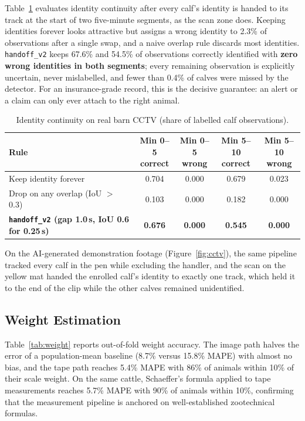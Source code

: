 \documentclass[11pt,letterpaper]{article}
\begin{document}
Table~\ref{tab:handoff} evaluates identity continuity after every calf's identity is handed to its track at the start of two five-minute segments, as the scan zone does. Keeping identities forever looks attractive but assigns a wrong identity to 2.3\% of observations after a single swap, and a naive overlap rule discards most identities. \texttt{handoff\_v2} keeps 67.6\% and 54.5\% of observations correctly identified with \textbf{zero wrong identities in both segments}; every remaining observation is explicitly uncertain, never mislabelled, and fewer than 0.4\% of calves were missed by the detector. For an insurance-grade record, this is the decisive guarantee: an alert or a claim can only ever attach to the right animal.

\begin{table}[H]
\centering
\caption{Identity continuity on real barn CCTV (share of labelled calf observations).}
\label{tab:handoff}
\small
\begin{tabular}{lcccc}
\toprule
Rule & \makecell{Min 0--5\\correct} & \makecell{Min 0--5\\wrong} & \makecell{Min 5--10\\correct} & \makecell{Min 5--10\\wrong} \\
\midrule
Keep identity forever & 0.704 & 0.000 & 0.679 & 0.023 \\
Drop on any overlap (IoU $>$ 0.3) & 0.103 & 0.000 & 0.182 & 0.000 \\
\textbf{\texttt{handoff\_v2} (gap 1.0\,s, IoU 0.6 for 0.25\,s)} & \textbf{0.676} & \textbf{0.000} & \textbf{0.545} & \textbf{0.000} \\
\bottomrule
\end{tabular}
\end{table}

On the AI-generated demonstration footage (Figure~\ref{fig:cctv}), the same pipeline tracked every calf in the pen while excluding the handler, and the scan on the yellow mat handed the enrolled calf's identity to exactly one track, which held it to the end of the clip while the other calves remained unidentified.

\subsection{Weight Estimation}

Table~\ref{tab:weight} reports out-of-fold weight accuracy. The image path halves the error of a population-mean baseline (8.7\% versus 15.8\% MAPE) with almost no bias, and the tape path reaches 5.4\% MAPE with 86\% of animals within 10\% of their scale weight. On the same cattle, Schaeffer's formula applied to tape measurements reaches 5.7\% MAPE with 90\% of animals within 10\%, confirming that the measurement pipeline is anchored on well-established zootechnical formulas.
\end{document}
